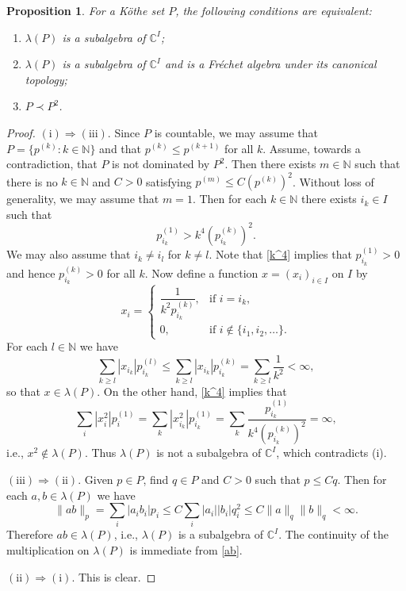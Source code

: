 \documentclass[12pt,reqno]{amsart}
\newtheorem{prop}[theorem]{Proposition}
\theoremstyle{definition}
\begin{document}
\begin{prop}
\label{prop:Kothe_alg}
For a K\"othe set $P$, the following conditions are equivalent:
\begin{enumerate}
\item[{\upshape (i)}] $\lambda(P)$ is a subalgebra of ${\mathbb C}^I$;
\item[{\upshape (ii)}] $\lambda(P)$ is a subalgebra of ${\mathbb C}^I$ and is a Fr\'echet algebra
under its canonical topology;
\item[{\upshape (iii)}] $P\prec P^2$.
\end{enumerate}
\end{prop}
\begin{proof}
$\mathrm{(i)}\Longrightarrow\mathrm{(iii)}$.
Since $P$ is countable, we may assume that $P=\{ p^{(k)} : k\in{\mathbb N}\}$ and that
$p^{(k)}\le p^{(k+1)}$ for all $k$.
Assume, towards a contradiction, that $P$ is not dominated by $P^2$.
Then there exists $m\in{\mathbb N}$ such that there is no $k\in{\mathbb N}$ and $C>0$ satisfying
$p^{(m)}\le C (p^{(k)})^2$.
Without loss of generality, we may assume that $m=1$.
Then for each $k\in{\mathbb N}$ there exists $i_k\in I$ such that
\begin{equation}
\label{k^4}
p_{i_k}^{(1)} > k^4 (p_{i_k}^{(k)})^2.
\end{equation}
We may also assume that $i_k\ne i_l$ for $k\ne l$.
Note that \eqref{k^4} implies that $p_{i_k}^{(1)}>0$
and hence $p_{i_k}^{(k)}>0$ for all $k$.
Now define a function $x=(x_i)_{i\in I}$ on $I$ by
\begin{equation*}
x_i=
\begin{cases}
\dfrac{1}{k^2 p_{i_k}^{(k)}}, & \text{if $i=i_k$},\\
0, & \text{if $i\notin\{ i_1,i_2,\ldots\}$}.
\end{cases}
\end{equation*}
For each $l\in{\mathbb N}$ we have
\[
\sum_{k\ge l} |x_{i_k}| p_{i_k}^{(l)}
\le \sum_{k\ge l} |x_{i_k}| p_{i_k}^{(k)}
=\sum_{k\ge l} \frac{1}{k^2}<\infty,
\]
so that $x\in\lambda(P)$. On the other hand, \eqref{k^4} implies that
\[
\sum_i |x_i^2| p_i^{(1)}=\sum_k |x_{i_k}^2| p_{i_k}^{(1)}
= \sum_k \frac{p_{i_k}^{(1)}}{k^4 (p_{i_k}^{(k)})^2}=\infty,
\]
i.e., $x^2\notin\lambda(P)$. Thus $\lambda(P)$ is not a subalgebra of ${\mathbb C}^I$,
which contradicts (i).

$\mathrm{(iii)}\Longrightarrow\mathrm{(ii)}$.
Given $p\in P$, find $q\in P$ and $C>0$ such that $p\le Cq$.
Then for each $a,b\in\lambda(P)$ we have
\begin{equation}
\label{ab}
\| ab\|_p=\sum_i |a_i b_i| p_i\le C\sum_i | a_i| |b_i| q_i^2
\le C \| a\|_q \| b\|_q<\infty.
\end{equation}
Therefore $ab\in\lambda(P)$, i.e., $\lambda(P)$ is a subalgebra of ${\mathbb C}^I$.
The continuity of the multiplication on $\lambda(P)$ is immediate from \eqref{ab}.

$\mathrm{(ii)}\Longrightarrow\mathrm{(i)}$. This is clear.
\end{proof}
\end{document}
